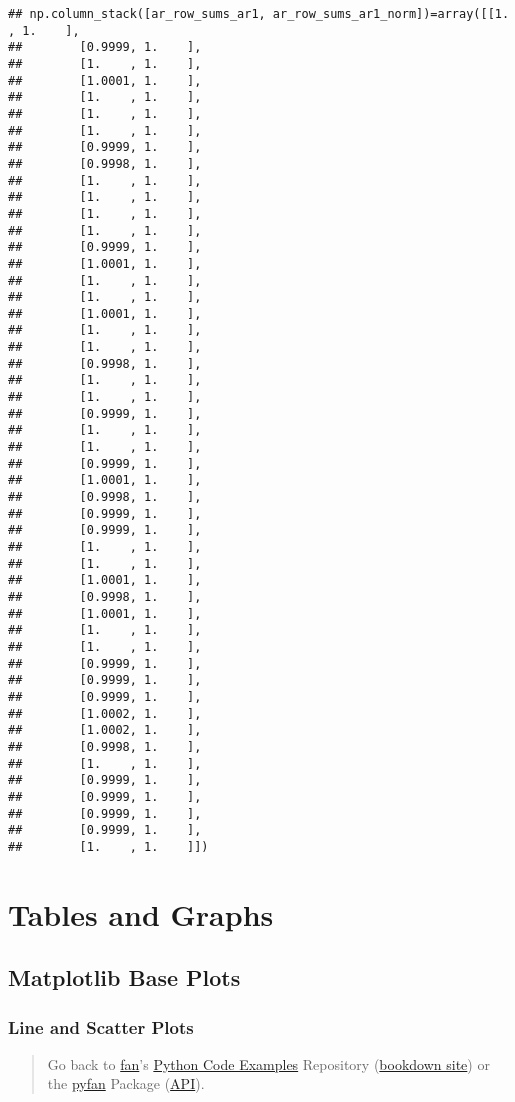 \documentclass[
]{book}
\begin{document}
\begin{verbatim}
## np.column_stack([ar_row_sums_ar1, ar_row_sums_ar1_norm])=array([[1.    , 1.    ],
##        [0.9999, 1.    ],
##        [1.    , 1.    ],
##        [1.0001, 1.    ],
##        [1.    , 1.    ],
##        [1.    , 1.    ],
##        [1.    , 1.    ],
##        [0.9999, 1.    ],
##        [0.9998, 1.    ],
##        [1.    , 1.    ],
##        [1.    , 1.    ],
##        [1.    , 1.    ],
##        [1.    , 1.    ],
##        [0.9999, 1.    ],
##        [1.0001, 1.    ],
##        [1.    , 1.    ],
##        [1.    , 1.    ],
##        [1.0001, 1.    ],
##        [1.    , 1.    ],
##        [1.    , 1.    ],
##        [0.9998, 1.    ],
##        [1.    , 1.    ],
##        [1.    , 1.    ],
##        [0.9999, 1.    ],
##        [1.    , 1.    ],
##        [1.    , 1.    ],
##        [0.9999, 1.    ],
##        [1.0001, 1.    ],
##        [0.9998, 1.    ],
##        [0.9999, 1.    ],
##        [0.9999, 1.    ],
##        [1.    , 1.    ],
##        [1.    , 1.    ],
##        [1.0001, 1.    ],
##        [0.9998, 1.    ],
##        [1.0001, 1.    ],
##        [1.    , 1.    ],
##        [1.    , 1.    ],
##        [0.9999, 1.    ],
##        [0.9999, 1.    ],
##        [0.9999, 1.    ],
##        [1.0002, 1.    ],
##        [1.0002, 1.    ],
##        [0.9998, 1.    ],
##        [1.    , 1.    ],
##        [0.9999, 1.    ],
##        [0.9999, 1.    ],
##        [0.9999, 1.    ],
##        [0.9999, 1.    ],
##        [1.    , 1.    ]])
\end{verbatim}

\hypertarget{tables-and-graphs}{%
\chapter{Tables and Graphs}\label{tables-and-graphs}}

\hypertarget{matplotlib-base-plots}{%
\section{Matplotlib Base Plots}\label{matplotlib-base-plots}}

\hypertarget{line-and-scatter-plots}{%
\subsection{Line and Scatter Plots}\label{line-and-scatter-plots}}

\begin{quote}
Go back to \href{http://fanwangecon.github.io/}{fan}'s \href{https://fanwangecon.github.io/Py4Econ/}{Python Code Examples} Repository (\href{https://fanwangecon.github.io/Py4Econ/bookdown}{bookdown site}) or the \href{https://pyfan.readthedocs.io/en/latest/}{pyfan} Package (\href{https://pyfan.readthedocs.io/en/latest/reference.html}{API}).
\end{quote}
\end{document}
